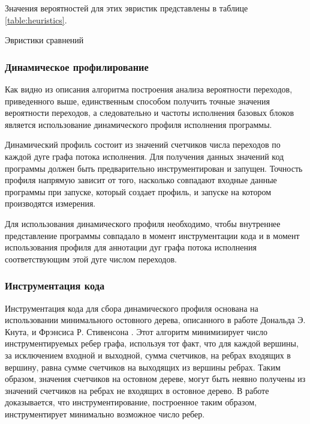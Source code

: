 Значения вероятностей для этих эвристик представлены в таблице \ref{table:heuristics}.

\begin{table}[]

\caption{Эвристики сравнений}
\label{table:heuristics}
\end{table}

\subsubsection{Динамическое профилирование}

Как видно из описания алгоритма построения анализа вероятности переходов, приведенного выше, единственным способом получить точные значения вероятности переходов, а следовательно и частоты исполнения базовых блоков является использование динамического профиля исполнения программы.

Динамический профиль состоит из значений счетчиков числа переходов по каждой дуге графа потока исполнения. Для получения данных значений код программы должен быть предварительно инструментирован и запущен. Точность профиля напрямую зависит от того, насколько совпадают входные данные программы при запуске, который создает профиль, и запуске на котором производятся измерения.

Для использования динамического профиля необходимо, чтобы внутреннее представление программы совпадало в момент инструментации кода и в момент использования профиля для аннотации дуг графа потока исполнения соответствующим этой дуге числом переходов.

\subsubsection{Инструментация кода}

Инструментация кода для сбора динамического профиля основана на использовании минимального остовного дерева, описанного в работе Дональда Э. Кнута, и Фрэнсиса Р. Стивенсона \cite{Knuth_Stevenson_1973}.
Этот алгоритм минимизирует число инструментируемых ребер графа, используя тот факт, что для каждой вершины, за исключением входной и выходной, сумма счетчиков, на ребрах входящих в вершину, равна сумме счетчиков на выходящих из вершины ребрах.
Таким образом, значения счетчиков на остовном дереве, могут быть неявно получены из значений счетчиков на ребрах не входящих в остовное дерево.
В работе доказывается, что инструментирование, построенное таким образом, инструментирует минимально возможное число ребер.


